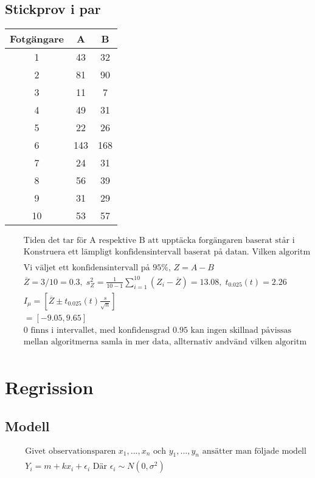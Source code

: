 \subsection{Stickprov i par}
\begin{tabular}{c|c|c}
 Fotgängare &  A & B \\
 \hline
     1      & 43  & 32 \\
     2      & 81  & 90 \\
     3      & 11  & 7 \\
     4      & 49  & 31 \\
     5      & 22  & 26 \\
     6      & 143 & 168 \\
     7      & 24  & 31 \\
     8      & 56  & 39 \\
     9      & 31  & 29 \\
    10      & 53  & 57 \\
\end{tabular}
\begin{align*}
  &\quad  \text{Tiden det tar för A respektive B att upptäcka forgängaren baserat står i tabellen}\\
  &\quad  \text{Konstruera ett lämpligt konfidensintervall baserat på datan. Vilken algoritm borde andvändas} \\
  &\quad  \\
  &\quad  \text{Vi väljet ett konfidensintervall på $95\%$, } Z=A-B \\
  &\quad  \overline{Z}=3/10=0.3, \; s^2_Z=\frac{1}{10-1}\sum_{i=1}^{10}(Z_i-\overline{Z})=13.08,
  \; t_{0.025}(t)=2.26 \\
  &\quad  I_{\mu} = [\overline{Z}\pm t_{0.025}(t)\frac{s}{\sqrt{n}}] \\
  &\quad          = [-9.05, 9.65] \\
  &\quad  0 \text{ finns i intervallet, med konfidensgrad $0.95$ kan ingen skillnad påvissas} \\
  &\quad  \text{mellan algoritmerna samla in mer data, allternativ andvänd vilken algoritm som helst} \\
\end{align*}


\section{Regrission}
\subsection{Modell}
\begin{align*}
  &\quad  \text{Givet observationsparen $x_1,...,x_n$ och $y_1,...,y_n$ ansätter man följade modell} \\
  &\quad  Y_i = m+kx_i+\epsilon_i \text{ Där } \epsilon_i\sim{N(0,\sigma^2)} \\
\end{align*}

